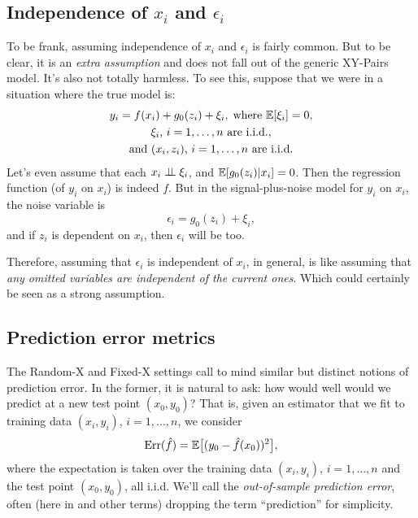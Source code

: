 \documentclass{article}
\begin{document}
\subsection{Independence of $x_i$ and $\epsilon_i$}

To be frank, assuming independence of $x_i$ and $\epsilon_i$ is fairly common.
But to be clear, it is an \emph{extra assumption} and does not fall out of the
generic XY-Pairs model. It's also not totally harmless. To see this, suppose
that we were in a situation where the true model is:  
\begin{gather*}
y_i = f(x_i) + g_0(z_i) + \xi_i, \; \text{where $\mathbb{E}[\xi_i] = 0$}, \\  
\text{$\xi_i$, $i=1,\dots,n$ are i.i.d.}, \\
\text{and $(x_i,z_i)$, $i=1,\dots,n$ are i.i.d.}
\end{gather*}
Let's even assume that each $x_i \perp\!\!\!\perp \xi_i$, and $\mathbb{E}[g_0(z_i) | x_i] =
0$. Then the regression function (of $y_i$ on $x_i$) is indeed $f$. But in the  
signal-plus-noise model for $y_i$ on $x_i$, the noise variable is 
\[
\epsilon_i = g_0(z_i) + \xi_i,
\]
and if $z_i$ is dependent on $x_i$, then $\epsilon_i$ will be too.

Therefore, assuming that $\epsilon_i$ is independent of $x_i$, in general, is
like assuming that \emph{any omitted variables are independent of the current
  ones}. Which could certainly be seen as a strong assumption.   

\subsection{Prediction error metrics}

\def\Err{\mathrm{Err}}
\def\Risk{\mathrm{Risk}}

The Random-X and Fixed-X settings call to mind similar but distinct notions of 
prediction error. In the former, it is natural to ask: how would well would we
predict at a new test point $(x_0,y_0)$? That is, given an estimator
\smash{$\hf$} that we fit to training data $(x_i,y_i)$, $i=1,\dots,n$, we 
consider       
\[
\Err(\hf) = \E\big[ (y_0 - \hf(x_0))^2 \big],
\]
where the expectation is taken over the training data $(x_i,y_i)$, $i=1,\dots,n$
and the test point $(x_0,y_0)$, all i.i.d. We'll call \smash{$\Err(\hf)$} the
\emph{out-of-sample prediction error}, often (here in and other terms) dropping
the term ``prediction'' for simplicity.  
\end{document}
